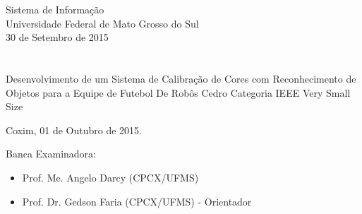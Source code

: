 


\textofree{}



\vskip 0.5cm
\begin{center}
Sistema de Informação\\
Universidade Federal de Mato Grosso do Sul\\
30 de Setembro de 2015
\end{center}


\chapter*{}

\begin{center}

\begin{minipage}[t]{10cm}
	\begin{center}
		\vspace{-2cm}
		{{\Large Desenvolvimento de um Sistema de Calibração de Cores com Reconhecimento de Objetos para a Equipe de Futebol De Robôs Cedro Categoria IEEE Very Small Size}}  
	\end{center}
\end{minipage}

\end{center}


\begin{flushright}
	\vspace{12cm}
	Coxim, 01 de Outubro de 2015.
\end{flushright}

\vspace{2cm}
Banca Examinadora:

\begin{itemize}
	\item Prof. Me. Angelo Darcy (CPCX/UFMS) 
	\item Prof. Dr. Gedson Faria (CPCX/UFMS) - Orientador
\end{itemize}

